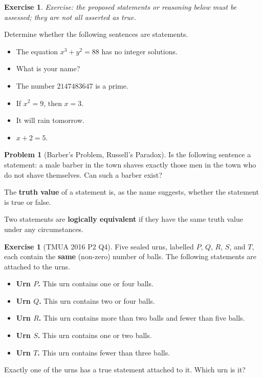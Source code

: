 \documentclass[11pt]{article}
\theoremstyle{definition}
\newtheorem{example}[theorem]{Exercise}
\newtheorem{problem}[theorem]{Problem}
\theoremstyle{remark}
\begin{document}
\begin{example}\label{tmua-6-unit-001}
\textit{Exercise: the proposed statements or reasoning below must be assessed; they are not all asserted as true.}\par

    Determine whether the following sentences are statements.
    \begin{itemize}
        \item The equation \(x^3 + y^2 = 88\) has no integer solutions.
        \item What is your name?
        \item The number \(2147483647\) is a prime.
        \item If \(x^2 = 9\), then \(x = 3\).
        \item It will rain tomorrow.
        \item \(x + 2 = 5\).
    \end{itemize}
\end{example}

\begin{problem}[Barber's Problem, Russell's Paradox]\label{tmua-6-unit-002}
    Is the following sentence a statement: a male barber in the town shaves exactly those men in the town who do not shave themselves. Can such a barber exist?
\end{problem}

The \textbf{truth value} of a statement is, as the name suggests, whether the statement is true or false.

Two statements are \textbf{logically equivalent} if they have the same truth value under any circumstances.

\begin{example}[TMUA 2016 P2 Q4]\label{tmua-6-unit-003}
    Five sealed urns, labelled \(P\), \(Q\), \(R\), \(S\), and \(T\), each contain the \textbf{same} (non-zero) number of balls. The following statements are attached to the urns.

    \begin{itemize}
        \item \textbf{Urn \(P\).} This urn contains one or four balls.
        \item \textbf{Urn \(Q\).} This urn contains two or four balls.
        \item \textbf{Urn \(R\).} This urn contains more than two balls and fewer than five balls.
        \item \textbf{Urn \(S\).} This urn contains one or two balls.
        \item \textbf{Urn \(T\).} This urn contains fewer than three balls.
    \end{itemize}

    Exactly one of the urns has a true statement attached to it. Which urn is it?
\end{example}
\end{document}
